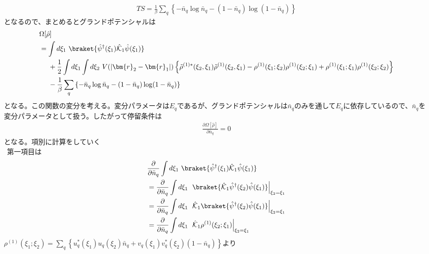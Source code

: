 \documentclass[dvipdfmx, 11pt, a4paper]{jsarticle}
\numberwithin{equation}{section}
\theoremstyle{definition}
\begin{document}
\begin{derivationBox}
        \begin{align}
            TS= \frac{1}{\beta} \sum_q\left\{ -\bar{n}_q\log \bar{n}_q - (1-\bar{n}_q)\log(1-\bar{n}_q) \right\}
        \end{align}
        となるので、まとめるとグランドポテンシャルは
        \begin{align}
            &\Omega[\hat{\rho}]\notag \\
            &=\int d\xi_1\ \braket{\hat{\psi}^\dagger(\xi_1) \hat{\mathcal{K}}_1 \hat{\psi}(\xi_1)} \notag \\
            &\ \ \ \ +\frac{1}{2}\int d\xi_1\int d\xi_2\ V(\left| \bm{r}_2-\bm{r}_1 \right|) \left\{ \tilde{\rho}^{(1)*}(\xi_2,\xi_1) \tilde{\rho}^{(1)}(\xi_2,\xi_1) - \rho^{(1)}(\xi_1;\xi_2) \rho^{(1)}(\xi_2;\xi_1) + \rho^{(1)}(\xi_1;\xi_1)\rho^{(1)}(\xi_2;\xi_2) \right\} \notag \\
            &\ \ \ \ - \frac{1}{\beta} \sum_q\left\{ -\bar{n}_q\log \bar{n}_q - (1-\bar{n}_q)\log(1-\bar{n}_q) \right\}
        \end{align}
        となる。この関数の変分を考える。変分パラメータは$E_q$であるが、グランドポテンシャルは$\bar{n}_q$のみを通して$E_q$に依存しているので、$\bar{n}_q$を変分パラメータとして扱う。したがって停留条件は
        \begin{align}
            \frac{\partial \Omega[\hat{\rho}]}{\partial \bar{n}_q} = 0
        \end{align}
        となる。項別に計算をしていく \\
        $\ \ $第一項目は
        \begin{align}
            &\frac{\partial}{\partial \bar{n}_q} \int d\xi_1\ \braket{\hat{\psi}^\dagger(\xi_1) \hat{\mathcal{K}}_1 \hat{\psi}(\xi_1)} \notag \\
            &= \frac{\partial}{\partial \bar{n}_q} \int d\xi_1\ \left. \braket{\hat{\mathcal{K}}_1\hat{\psi}^\dagger(\xi_2)  \hat{\psi}(\xi_1)} \right|_{\xi_2 = \xi_1} \notag \\
            &= \frac{\partial}{\partial \bar{n}_q} \int d\xi_1\ \left. \hat{\mathcal{K}}_1\braket{\hat{\psi}^\dagger(\xi_2)  \hat{\psi}(\xi_1)} \right|_{\xi_2 = \xi_1} \notag \\
            &= \frac{\partial}{\partial \bar{n}_q} \int d\xi_1\ \left. \hat{\mathcal{K}}_1\rho^{(1)}(\xi_2;\xi_1) \right|_{\xi_2 = \xi_1} 
        \end{align}
        $\rho^{(1)}(\xi_1;\xi_2) = \sum_q\left\{ u_q^*(\xi_1)u_q(\xi_2)\bar{n}_q+v_q(\xi_1)v_q^*(\xi_2)(1-\bar{n}_q) \right\} $より
        \begin{align}

\end{align}
\end{derivationBox}
\end{document}
